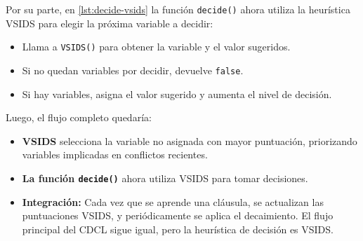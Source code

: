 Por su parte, en \ref{lst:decide-vsids} la función \texttt{decide()} ahora utiliza la heurística VSIDS para elegir la próxima variable a decidir:

\begin{itemize}
    \item Llama a \texttt{VSIDS()} para obtener la variable y el valor sugeridos.
    \item Si no quedan variables por decidir, devuelve \texttt{false}.
    \item Si hay variables, asigna el valor sugerido y aumenta el nivel de decisión.
\end{itemize}

Luego, el flujo completo quedar\'ia:

\begin{itemize}
    \item \textbf{VSIDS} selecciona la variable no asignada con mayor puntuación, priorizando variables implicadas en conflictos recientes.
    \item \textbf{La función \texttt{decide()}} ahora utiliza VSIDS para tomar decisiones.
    \item \textbf{Integración:} Cada vez que se aprende una cláusula, se actualizan las puntuaciones VSIDS, y periódicamente se aplica el decaimiento. El flujo principal del CDCL sigue igual, pero la heurística de decisión es VSIDS.
\end{itemize}



